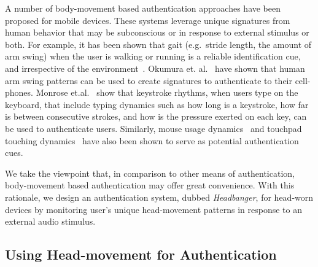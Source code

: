 

A number of body-movement based authentication approaches have been proposed for mobile devices. These systems
leverage unique signatures from human behavior that may be subconscious
or in response to external stimulus or both.  For example, it has been shown that gait (e.g.~stride length, the amount of arm swing) when the user is walking or
running is a reliable identification cue, and irrespective of the
environment~\cite{stevenage1999visual}. Okumura et. al.~\cite{okumura2006study}
have shown that human arm swing patterns can be used to create signatures
to authenticate to their cell-phones. Monrose
et.al.~\cite{monrose2000keystroke} show that keystroke rhythms, when
users type on the keyboard, that include typing dynamics such as how
long is a keystroke, how far is between consecutive strokes, and how is the
pressure exerted on each key, can be used to authenticate
users. Similarly, mouse usage dynamics~\cite{jorgensen2011mouse} and touchpad
touching dynamics~\cite{bo2013silentsense,de2012touch} have also been shown to
serve as potential authentication cues.

We take the viewpoint that, in comparison to other means of authentication, body-movement based
authentication may offer great convenience. %
With this rationale, we design an authentication system, dubbed {\em Headbanger}, for head-worn
devices by monitoring user's unique head-movement patterns in response to an
external audio stimulus.

\subsection{Using Head-movement for Authentication}
\label{subsec:headmovements}

